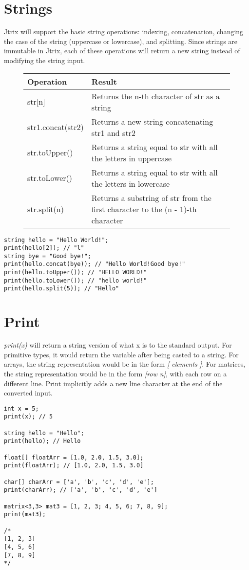 \documentclass[titlepage, 12pt]{report}
\begin{document}
\pagebreak

\section{Strings}
Jtrix will support the basic string operations: indexing, concatenation, changing the case of the string (uppercase or lowercase), and splitting. Since strings are immutable in Jtrix, each of these operations will return a new string instead of modifying the string input.
\begin{figure}[h]
\begin{tabular}{|l|l|}
\hline
Operation     & Result                                                                          \\ \hline
str{[}n{]}    & Returns the n-th character of str as a string                                   \\ \hline
str1.concat(str2)   & Returns a new string concatenating str1 and str2                                \\ \hline
str.toUpper() & Returns a string equal to str with all the letters in uppercase                 \\ \hline
str.toLower() & Returns a string equal to str with all the letters in lowercase                 \\ \hline
str.split(n)  & Returns a substring of str from the first character to the (n - 1)-th character \\ \hline
\end{tabular}
\end{figure}
\begin{lstlisting}
string hello = "Hello World!";
print(hello[2]); // "l"
string bye = "Good bye!";
print(hello.concat(bye)); // "Hello World!Good bye!"
print(hello.toUpper()); // "HELLO WORLD!"
print(hello.toLower()); // "hello world!"
print(hello.split(5)); // "Hello" 
\end{lstlisting}
\section{Print}
\textit{print(x)} will return a string version of what x is to the standard output. For primitive types, it would return the variable after being casted to a string. For arrays, the string representation would be in the form \textit{[ elements ]}. For matrices, the string representation would be in the form \textit{[row n]}, with each row on a different line. Print implicitly adds a new line character at the end of the converted input.
\begin{lstlisting}
int x = 5;
print(x); // 5

string hello = "Hello";
print(hello); // Hello

float[] floatArr = [1.0, 2.0, 1.5, 3.0];
print(floatArr); // [1.0, 2.0, 1.5, 3.0]

char[] charArr = ['a', 'b', 'c', 'd', 'e'];
print(charArr); // ['a', 'b', 'c', 'd', 'e']

matrix<3,3> mat3 = [1, 2, 3; 4, 5, 6; 7, 8, 9];
print(mat3);

/* 
[1, 2, 3]
[4, 5, 6]
[7, 8, 9]
*/
\end{lstlisting}
\end{document}
